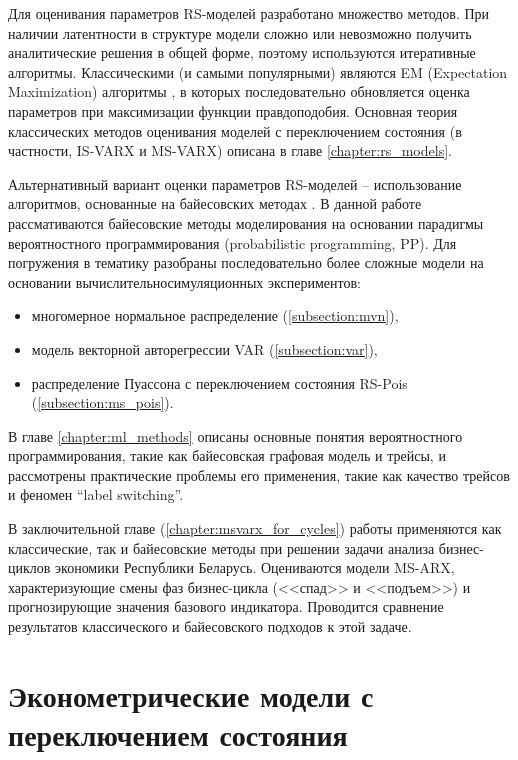 \documentclass[a4paper,14pt]{extreport}
\begin{document}
Для оценивания параметров RS-моделей разработано множество методов. При наличии латентности в структуре модели сложно или невозможно получить аналитические решения в общей форме, поэтому используются итеративные алгоритмы. Классическими (и самыми популярными) являются EM (Expectation Maximization) алгоритмы \cite{malNovopMSVARX, malNovopHiddenMarkov, rs_hamilton_palgrave}, в которых последовательно обновляется оценка параметров при максимизации функции правдоподобия. Основная теория классических методов оценивания моделей с переключением состояния (в частности, IS-VARX и MS-VARX) описана в главе \ref{chapter:rs_models}.

Альтернативный вариант оценки параметров RS-моделей -- использование алгоритмов, основанные на байесовских методах \cite{rs_persio2014, rs_hamilton_palgrave}.
В данной работе рассмативаются байесовские методы моделирования на основании парадигмы вероятностного программирования (probabilistic programming, PP). 
Для погружения в тематику разобраны последовательно более сложные модели на основании вычислительно\-симуляционных экспериментов:

\begin{itemize}
	\item многомерное нормальное распределение (\ref{subsection:mvn}),
	\item модель векторной авторегрессии VAR (\ref{subsection:var}),
	\item распределение Пуассона с переключением состояния RS-Pois (\ref{subsection:ms_pois}).
\end{itemize}

\noindent
В главе \ref{chapter:ml_methods} описаны основные понятия вероятностного программирования, такие как байесовская графовая модель и трейсы, и рассмотрены практические проблемы его применения, такие как качество трейсов и феномен ``label switching''.

В заключительной главе (\ref{chapter:msvarx_for_cycles}) работы применяются как классические, так и байесовские методы при решении задачи анализа бизнес-циклов экономики Республики Беларусь. Оцениваются модели MS-ARX, характеризующие смены фаз бизнес-цикла (<<спад>> и <<подъем>>) и прогнозирующие значения базового индикатора. Проводится сравнение результатов классического и байесовского подходов к этой задаче.


\chapter{Эконометрические модели с переключением состояния}
\end{document}
